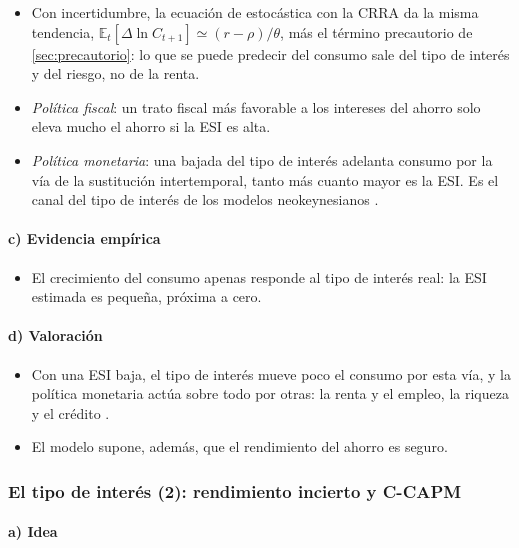 \documentclass[11pt]{article}
\begin{document}
\begin{itemize}
\item Con incertidumbre, la ecuación de  estocástica con la CRRA da la misma tendencia, $\mathbb{E}_t[\Delta\ln C_{t+1}]\simeq(r-\rho)/\theta$, más el término precautorio de \ref{sec:precautorio}: lo que se puede predecir del consumo sale del tipo de interés y del riesgo, no de la renta.
\item \emph{Política fiscal}: un trato fiscal más favorable a los intereses del ahorro solo eleva mucho el ahorro si la ESI es alta.
\item \emph{Política monetaria}: una bajada del tipo de interés adelanta consumo por la vía de la sustitución intertemporal, tanto más cuanto mayor es la ESI. Es el canal del tipo de interés de los modelos neokeynesianos .
\end{itemize}

\paragraph{c) Evidencia empírica}

\begin{itemize}
\item El crecimiento del consumo apenas responde al tipo de interés real: la ESI estimada es pequeña, próxima a cero\nocite{Hall1988Intertemporal,CampbellMankiw1989Consumption}.
\end{itemize}

\paragraph{d) Valoración}

\begin{itemize}
\item Con una ESI baja, el tipo de interés mueve poco el consumo por esta vía, y la política monetaria actúa sobre todo por otras: la renta y el empleo, la riqueza y el crédito .
\item El modelo supone, además, que el rendimiento del ahorro es seguro.
\end{itemize}

\subsubsection{El tipo de interés (2): rendimiento incierto y C-CAPM}\label{sec:ccapm}

\paragraph{a) Idea}
\end{document}
